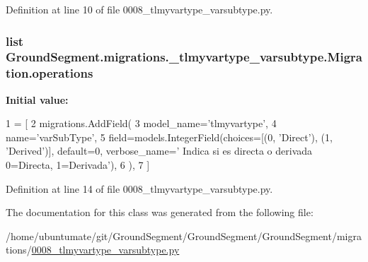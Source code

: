Definition at line 10 of file 0008\+\_\+tlmyvartype\+\_\+varsubtype.\+py.

\hypertarget{class_ground_segment_1_1migrations_1_10008__tlmyvartype__varsubtype_1_1_migration_a5f19c537bf10cef31d6fac0da2c2f4b5}{}
\subsubsection[{operations}]{\setlength{\rightskip}{0pt plus 5cm}list Ground\+Segment.\+migrations.\+\_\+tlmyvartype\+\_\+varsubtype.\+Migration.\+operations\hspace{0.3cm}{\ttfamily [static]}}\label{class_ground_segment_1_1migrations_1_10008__tlmyvartype__varsubtype_1_1_migration_a5f19c537bf10cef31d6fac0da2c2f4b5}
{\bfseries Initial value\+:}
\begin{DoxyCode}
1 = [
2         migrations.AddField(
3             model\_name=\textcolor{stringliteral}{'tlmyvartype'},
4             name=\textcolor{stringliteral}{'varSubType'},
5             field=models.IntegerField(choices=[(0, \textcolor{stringliteral}{'Direct'}), (1, \textcolor{stringliteral}{'Derived'})], default=0, verbose\_name=\textcolor{stringliteral}{'
      Indica si es directa o derivada 0=Directa, 1=Derivada'}),
6         ),
7     ]
\end{DoxyCode}


Definition at line 14 of file 0008\+\_\+tlmyvartype\+\_\+varsubtype.\+py.



The documentation for this class was generated from the following file\+:\begin{DoxyCompactItemize}
\item 
/home/ubuntumate/git/\+Ground\+Segment/\+Ground\+Segment/\+Ground\+Segment/migrations/\hyperlink{0008__tlmyvartype__varsubtype_8py}{0008\+\_\+tlmyvartype\+\_\+varsubtype.\+py}\end{DoxyCompactItemize}
